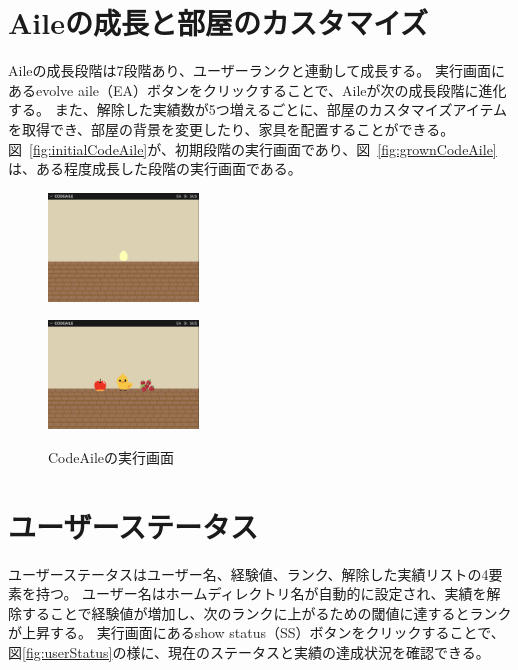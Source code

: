 \documentclass[12pt,twoside]{jbook}
\begin{document}
\section{Aileの成長と部屋のカスタマイズ}
 Aileの成長段階は7段階あり、ユーザーランクと連動して成長する。
実行画面にあるevolve aile（EA）ボタンをクリックすることで、Aileが次の成長段階に進化する。
また、解除した実績数が5つ増えるごとに、部屋のカスタマイズアイテムを取得でき、部屋の背景を変更したり、家具を配置することができる。
図~\ref{fig:initialCodeAile}が、初期段階の実行画面であり、図~\ref{fig:grownCodeAile}は、ある程度成長した段階の実行画面である。

\begin{figure}[t]
	\begin{minipage}[b]{0.48\linewidth}
		\centering
		\includegraphics[width=4cm]{images/initialCodeAile}
		\label{fig:initialCodeAile}
	\end{minipage}
	\hfill
	\begin{minipage}[b]{0.48\linewidth}
		\centering
		\includegraphics[width=4cm]{images/grownCodeAile}
		\label{fig:grownCodeAile}
	\end{minipage}
	\hfill
	\caption{CodeAileの実行画面}
	\label{fig:codeAile}
\end{figure}

\section{ユーザーステータス}
 ユーザーステータスはユーザー名、経験値、ランク、解除した実績リストの4要素を持つ。
ユーザー名はホームディレクトリ名が自動的に設定され、実績を解除することで経験値が増加し、次のランクに上がるための閾値に達するとランクが上昇する。
実行画面にあるshow status（SS）ボタンをクリックすることで、図\ref{fig:userStatus}の様に、現在のステータスと実績の達成状況を確認できる。
\end{document}
